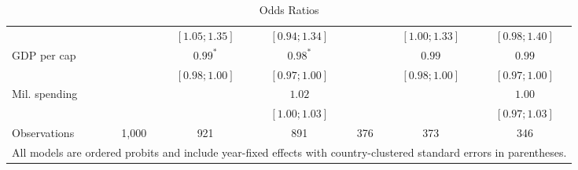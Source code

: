 \begin{table}[h!]
\begin{center}
\begin{tabular}{l c c c c c c}
                      &                 & $ [1.05; 1.35]$ & $ [0.94; 1.34]$ &                 & $ [1.00; 1.33]$ & $ [0.98; 1.40]$ \\
\quad GDP per cap     &                 & $0.99^{*}$      & $0.98^{*}$      &                 & $0.99$          & $0.99$          \\
                      &                 & $ [0.98; 1.00]$ & $ [0.97; 1.00]$ &                 & $ [0.98; 1.00]$ & $ [0.97; 1.00]$ \\
\quad Mil. spending   &                 &                 & $1.02$          &                 &                 & $1.00$          \\
                      &                 &                 & $ [1.00; 1.03]$ &                 &                 & $ [0.97; 1.03]$ \\
\hline
Observations          & 1,000           & 921             & 891             & 376             & 373             & 346             \\
\hline
\multicolumn{7}{l}{\scriptsize{All models are ordered probits and include year-fixed effects with country-clustered standard errors in parentheses.}}
\end{tabular}
\caption{Odds Ratios}
\label{table:coefficients}
\end{center}
\end{table}
